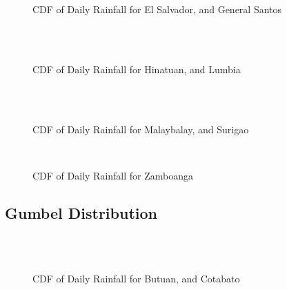 \begin{figure}[H]
  \centering
  \\
  \\
  \caption{CDF of Daily Rainfall for El Salvador, and General Santos}
  \label{fig:daily_without_threshold_appendix_gev_pt3}
\end{figure}

\begin{figure}[H]
  \centering
  \\
  \\
  \caption{CDF of Daily Rainfall for Hinatuan, and Lumbia}
  \label{fig:daily_without_threshold_appendix_gev_pt4}
\end{figure}

\begin{figure}[H]
  \centering
  \\
  \\
  \caption{CDF of Daily Rainfall for Malaybalay, and Surigao}
  \label{fig:daily_without_threshold_appendix_gev_pt5}
\end{figure}

\begin{figure}[H]
  \centering
  \\
  \caption{CDF of Daily Rainfall for Zamboanga}
  \label{fig:daily_without_threshold_appendix_gev_pt6}
\end{figure}

\subsection{Gumbel Distribution}

\begin{figure}[H]
  \centering
  \\
  \\
  \caption{CDF of Daily Rainfall for Butuan, and Cotabato}
  \label{fig:daily_without_threshold_appendix_gd_pt1}
\end{figure}


